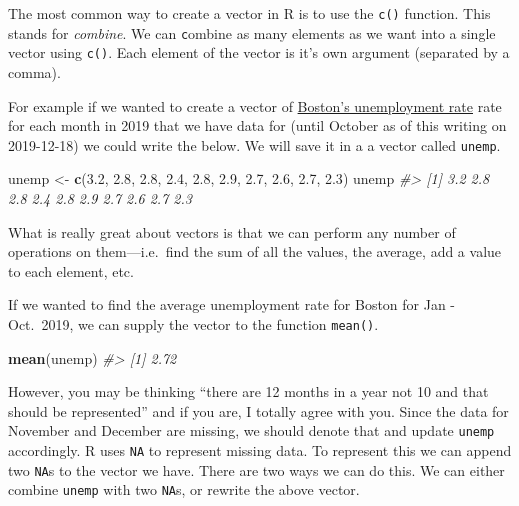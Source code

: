 \documentclass[
]{book}
\newenvironment{Shaded}{\begin{snugshade}}{\end{snugshade}}
\newcommand{\CommentTok}[1]{\textcolor[rgb]{0.56,0.35,0.01}{\textit{#1}}}
\newcommand{\FloatTok}[1]{\textcolor[rgb]{0.00,0.00,0.81}{#1}}
\newcommand{\KeywordTok}[1]{\textcolor[rgb]{0.13,0.29,0.53}{\textbf{#1}}}
\newcommand{\NormalTok}[1]{#1}
\newcommand{\StringTok}[1]{\textcolor[rgb]{0.31,0.60,0.02}{#1}}
\begin{document}
The most common way to create a vector in R is to use the \texttt{c()} function. This stands for \emph{combine}. We can \texttt{c}ombine as many elements as we want into a single vector using \texttt{c()}. Each element of the vector is it's own argument (separated by a comma).

For example if we wanted to create a vector of \href{https://data.bls.gov/timeseries/LAUMT257165000000003?amp\%253bdata_tool=XGtable\&output_view=data\&include_graphs=true}{Boston's unemployment rate} rate for each month in 2019 that we have data for (until October as of this writing on 2019-12-18) we could write the below. We will save it in a a vector called \texttt{unemp}.

\begin{Shaded}
\begin{Highlighting}[]
\NormalTok{unemp \textless{}{-}}\StringTok{ }\KeywordTok{c}\NormalTok{(}\FloatTok{3.2}\NormalTok{, }\FloatTok{2.8}\NormalTok{, }\FloatTok{2.8}\NormalTok{, }\FloatTok{2.4}\NormalTok{, }\FloatTok{2.8}\NormalTok{, }\FloatTok{2.9}\NormalTok{, }\FloatTok{2.7}\NormalTok{, }\FloatTok{2.6}\NormalTok{, }\FloatTok{2.7}\NormalTok{, }\FloatTok{2.3}\NormalTok{)}
\NormalTok{unemp}
\CommentTok{\#\textgreater{}  [1] 3.2 2.8 2.8 2.4 2.8 2.9 2.7 2.6 2.7 2.3}
\end{Highlighting}
\end{Shaded}

What is really great about vectors is that we can perform any number of operations on them---i.e.~find the sum of all the values, the average, add a value to each element, etc.

If we wanted to find the average unemployment rate for Boston for Jan - Oct.~2019, we can supply the vector to the function \texttt{mean()}.

\begin{Shaded}
\begin{Highlighting}[]
\KeywordTok{mean}\NormalTok{(unemp)}
\CommentTok{\#\textgreater{} [1] 2.72}
\end{Highlighting}
\end{Shaded}

However, you may be thinking ``there are 12 months in a year not 10 and that should be represented'' and if you are, I totally agree with you. Since the data for November and December are missing, we should denote that and update \texttt{unemp} accordingly. R uses \texttt{NA} to represent missing data. To represent this we can append two \texttt{NA}s to the vector we have. There are two ways we can do this. We can either combine \texttt{unemp} with two \texttt{NA}s, or rewrite the above vector.
\end{document}
